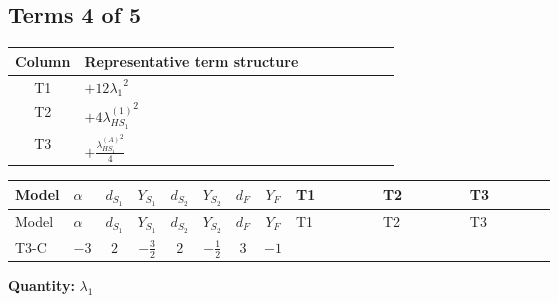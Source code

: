 \documentclass[8pt]{article}
\begin{document}
\begin{landscape}
\subsection*{Terms 4 of 5}
\begin{center}
\begin{tabular}{@{}c >{\raggedright\arraybackslash}p{0.82\linewidth}@{}}
\toprule
Column & Representative term structure \\
\midrule
T1 & \(\displaystyle +12 {\lambda_1}^2\) \\
\midrule
T2 & \(\displaystyle +4 {\lambda_{HS_1}^{(1)}}^2\) \\
\midrule
T3 & \(\displaystyle +\frac{{\lambda_{HS_1}^{(A)}}^2}{4}\) \\
\midrule
\bottomrule
\end{tabular}
\end{center}
\smallskip
\tiny
\begin{longtable}{@{}llcccccc >{\raggedright\arraybackslash}p{0.21\linewidth} >{\raggedright\arraybackslash}p{0.21\linewidth} >{\raggedright\arraybackslash}p{0.21\linewidth}@{}}
\toprule
Model & $\alpha$ & $d_{S_1}$ & $Y_{S_1}$ & $d_{S_2}$ & $Y_{S_2}$ & $d_F$ & $Y_F$ & T1 & T2 & T3 \\
\midrule
\endfirsthead
\toprule
Model & $\alpha$ & $d_{S_1}$ & $Y_{S_1}$ & $d_{S_2}$ & $Y_{S_2}$ & $d_F$ & $Y_F$ & T1 & T2 & T3 \\
\midrule
\endhead
T3-C & $-3$ & $2$ & $-\frac{3}{2}$ & $2$ & $-\frac{1}{2}$ & $3$ & $-1$ & \scriptsize\adjustbox{max width=\linewidth}{$\begin{gathered} +12 {\lambda_1}^2\end{gathered}$} & \scriptsize\adjustbox{max width=\linewidth}{$\begin{gathered} +4 {\lambda_{HS_1}^{(1)}}^2\end{gathered}$} & \scriptsize\adjustbox{max width=\linewidth}{$\begin{gathered} +\frac{{\lambda_{HS_1}^{(A)}}^2}{4}\end{gathered}$} \\
\midrule
\bottomrule
\end{longtable}
\clearpage
\noindent\textbf{Quantity: }$\lambda_1$\par\smallskip

\end{landscape}
\end{document}
